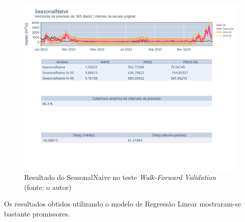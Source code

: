 \begin{figure}[!h]
	\centering
	\includegraphics[scale=0.33]{Figuras/jequiti/resultados/SN_WFV.png}
	\caption{Resultado do SeasonalNaive no teste \textit{Walk-Forward Validation}\\(fonte: o autor)}
	\label{fig:jequiti_SN_WFV}
\end{figure}


Os resultados obtidos utilizando o modelo de Regressão Linear mostraram-se bastante promissores.

